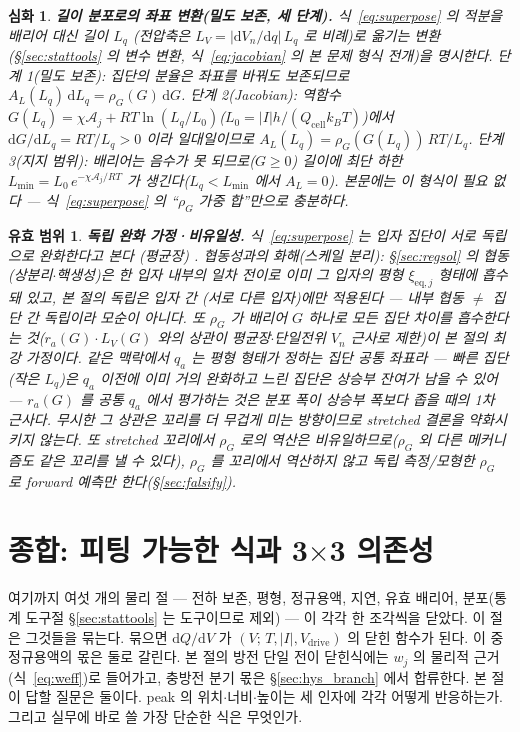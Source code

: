 \documentclass[11pt,a4paper]{article}
\newtheorem*{boundbox}{유효 범위}
\newtheorem*{rigorbox}{심화}
\newcommand{\dd}{\mathrm{d}}
\newcommand{\eq}{\mathrm{eq}}
\newcommand{\drive}{\mathrm{drive}}
\newcommand{\cell}{\mathrm{cell}}
\begin{document}
\begin{rigorbox}
\textbf{길이 분포로의 좌표 변환(밀도 보존, 세 단계).} 식~\eqref{eq:superpose} 의 적분을 배리어 대신 길이 $L_q$
(전압축은 $L_V=|\dd V_n/\dd q|\,L_q$ 로 비례)로 옮기는 변환(\S\ref{sec:stattools} 의 변수 변환, 식~\eqref{eq:jacobian} 의 본 문제 형식 전개)을 명시한다. \emph{단계 1(밀도 보존)}: 집단의 분율은 좌표를 바꿔도 보존되므로 $A_L(L_q)\,\dd L_q=\rho_G(G)\,\dd G$.
\emph{단계 2(Jacobian)}: 역함수 $G(L_q)=\chi\mathcal A_j+RT\ln(L_q/L_0)$($L_0=|I|h/(Q_\cell k_BT)$)에서
$\dd G/\dd L_q=RT/L_q>0$ 이라 일대일이므로 $A_L(L_q)=\rho_G(G(L_q))\,RT/L_q$. \emph{단계 3(지지 범위)}: 배리어는
음수가 못 되므로($G\ge0$) 길이에 최단 하한 $L_{\min}=L_0\,e^{-\chi\mathcal A_j/RT}$ 가 생긴다($L_q<L_{\min}$ 에서
$A_L=0$). 본문에는 이 형식이 필요 없다 — 식~\eqref{eq:superpose} 의 ``$\rho_G$ 가중 합''만으로 충분하다.
\end{rigorbox}
\begin{boundbox}
\textbf{독립 완화 가정·비유일성.} 식~\eqref{eq:superpose} 는 입자 집단이 \emph{서로 독립}으로 완화한다고 본다
(평균장) \cite{funabiki1999}. \emph{협동성과의 화해(스케일 분리)}: \S\ref{sec:regsol} 의 협동(상분리$\cdot$핵생성)은 한
입자 \emph{내부}의 일차 전이로 이미 그 입자의 평형 $\xi_{\eq,j}$ 형태에 흡수돼 있고, 본 절의 독립은 \emph{입자 \emph{간}}
(서로 다른 입자)에만 적용된다 — 내부 협동 $\ne$ 집단 간 독립이라 모순이 아니다. 또 $\rho_G$ 가 배리어 $G$ \emph{하나}로 모든 집단
차이를 흡수한다는 것($r_a(G)\cdot L_V(G)$ 와의 상관이 평균장$\cdot$단일전위 $V_n$ 근사로 제한)이 본 절의 최강 가정이다.
같은 맥락에서 $q_a$ 는 평형 형태가 정하는 \emph{집단 공통} 좌표라 — 빠른 집단(작은 $L_q$)은 $q_a$ 이전에 이미 거의
완화하고 느린 집단은 상승부 잔여가 남을 수 있어 — $r_a(G)$ 를 공통 $q_a$ 에서 평가하는 것은 분포 폭이 상승부 폭보다
좁을 때의 1차 근사다. 무시한 그 상관은 꼬리를 더 무겁게 미는 방향이므로 stretched 결론을 약화시키지 않는다.
또 stretched 꼬리에서 $\rho_G$ 로의 역산은
\emph{비유일}하므로($\rho_G$ 외 다른 메커니즘도 같은 꼬리를 낼 수 있다), $\rho_G$ 를 꼬리에서 역산하지 않고
독립 측정/모형한 $\rho_G$ 로 \emph{forward 예측}만 한다(\S\ref{sec:falsify}).
\end{boundbox}

\section{종합: 피팅 가능한 식과 3$\times$3 의존성}\label{sec:synth}
여기까지 여섯 개의 물리 절 — 전하 보존, 평형, 정규용액, 지연, 유효 배리어, 분포(통계 도구절 \S\ref{sec:stattools}
는 도구이므로 제외) — 이 각각 한 조각씩을 닫았다. 이 절은 그것들을 묶는다. 묶으면 $\dd Q/\dd V$ 가
$(V;\,T,|I|,V_\drive)$ 의 닫힌 함수가 된다. 이 중 정규용액의 몫은 둘로 갈린다. 본 절의 방전 단일 전이 닫힌식에는
$w_j$ 의 물리적 근거(식~\eqref{eq:weff})로 들어가고, 충방전 분기 몫은 \S\ref{sec:hys_branch} 에서 합류한다.
본 절이 답할 질문은 둘이다. peak 의 위치$\cdot$너비$\cdot$높이는 세 인자에 각각 어떻게 반응하는가. 그리고
실무에 바로 쓸 가장 단순한 식은 무엇인가.
\end{document}
